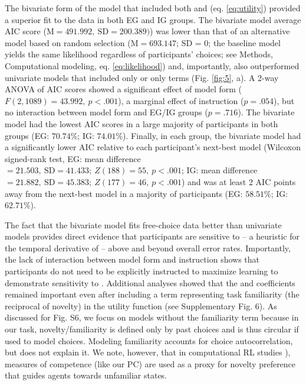     The bivariate form of the model that included both {\LP} and {\PC} (eq. \ref{eq:utility}) provided a superior fit to the data in both EG and IG groups. The bivariate model average AIC score ($\text{M}=491.992,\ \text{SD}=200.389)$) was lower than that of an alternative model based on random selection ($\text{M} = 693.147$; SD = 0; the baseline model yields the same likelihood regardless of participants' choices; see Methods, Computational modeling, eq. \ref{eq:likelihood}) and, importantly, also outperformed univariate models that included only {\LP} or only {\PC} terms (Fig. \ref{fig:5}, a). A 2-way ANOVA of AIC scores showed a significant effect of model form ($F(2, 1089) = 43.992, \ p < .001$), a marginal effect of instruction ($p = .054$), but no interaction between model form and EG/IG groups ($p = .716$). The bivariate model had the lowest AIC scores in a large majority of participants in both groups (EG: $70.74\%$; IG: $74.01\%$). Finally, in each group, the bivariate model had a significantly lower AIC relative to each participant's next-best model (Wilcoxon signed-rank test, EG: mean difference $=21.503,\ \text{SD} = 41.433;\ Z(188) = 55,\ p < .001$; IG: mean difference $=21.882,\ \text{SD} = 45.383;\ Z(177) = 46,\ p < .001$) and was at least 2 AIC points away from the next-best model in a majority of participants (EG: $58.51\%$; IG: $62.71\%$).   
    
    The fact that the bivariate model fits free-choice data better than univariate models provides direct evidence that participants are sensitive to {\LP} – a heuristic for the temporal derivative of {\PC} – above and beyond overall error rates. Importantly, the lack of interaction between model form and instruction shows that participants do not need to be explicitly instructed to maximize learning to demonstrate sensitivity to {\LP}. Additional analyses showed that the {\PC} and {\LP} coefficients remained important even after including a term representing task familiarity (the reciprocal of novelty) in the utility function (see Supplementary Fig. 6). As discussed for Fig. S6, we focus on models without the familiarity term because in our task, novelty/familiarity is defined only by past choices and is thus circular if used to model choices. Modeling familiarity accounts for choice autocorrelation, but does not explain it. We note, however, that in computational RL studies \cite{pathak2017curiosity,bougie2020fast}), measures of competence (like our PC) are used as a proxy for novelty preference that guides agents towards unfamiliar states.
    
